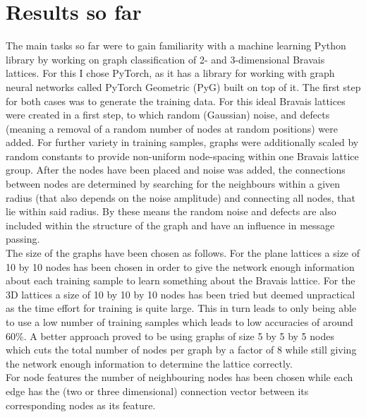 \documentclass[11pt,a4paper]{article}
\begin{document}
\section{Results so far}
\label{sec:Results so far}
The main tasks so far were to gain familiarity with a machine learning Python library by working on graph classification of 2- and 3-dimensional Bravais lattices. 
For this I chose PyTorch, as it has a library for working with graph neural networks called PyTorch Geometric (PyG) built on top of it. 
The first step for both cases was to generate the training data. 
For this ideal Bravais lattices were created in a first step, to which random (Gaussian) noise, and defects (meaning a removal of a random number of nodes at random positions) were added. 
For further variety in training samples, graphs were additionally scaled by random constants to provide non-uniform node-spacing within one Bravais lattice group. 
After the nodes have been placed and noise was added, the connections between nodes are determined by searching for the neighbours within a given radius (that also depends on the noise amplitude) and connecting all nodes, that lie within said radius. 
By these means the random noise and defects are also included within the structure of the graph and have an influence in message passing. \\
The size of the graphs have been chosen as follows. 
For the plane lattices a size of 10 by 10 nodes has been chosen in order to give the network enough information about each training sample to learn something about the Bravais lattice. 
For the 3D lattices a  size of 10 by 10 by 10 nodes has been tried but deemed unpractical as the time effort for training is quite large. 
This in turn leads to only being able to use a low number of training samples which leads to low accuracies of around 60\%. 
A better approach proved to be using graphs of size 5 by 5 by 5 nodes which cuts the total number of nodes per graph by a factor of 8 while still giving the network enough information to determine the lattice correctly. \\
For node features the number of neighbouring nodes has been chosen while each edge has the (two or three dimensional) connection vector between its corresponding nodes as its feature. 
\end{document}

